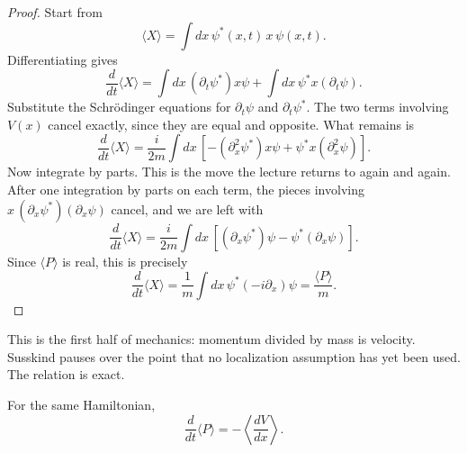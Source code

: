 \begin{proof}
Start from
\begin{equation}
\langle X\rangle=\int dx\,\psi^*(x,t)\,x\,\psi(x,t).
\end{equation}
Differentiating gives
\begin{equation}
\frac{d}{dt}\langle X\rangle
=
\int dx\,(\partial_t\psi^*)x\psi
+
\int dx\,\psi^*x(\partial_t\psi).
\end{equation}
Substitute the Schr\"odinger equations for \(\partial_t\psi\) and \(\partial_t\psi^*\). The two terms involving \(V(x)\) cancel exactly, since they are equal and opposite. What remains is
\begin{equation}
\frac{d}{dt}\langle X\rangle
=
\frac{i}{2m}\int dx\,
\left[
-(\partial_x^2\psi^*)x\psi+\psi^*x(\partial_x^2\psi)
\right].
\end{equation}
Now integrate by parts. This is the move the lecture returns to again and again. After one integration by parts on each term, the pieces involving \(x\,(\partial_x\psi^*)(\partial_x\psi)\) cancel, and we are left with
\begin{equation}
\frac{d}{dt}\langle X\rangle
=
\frac{i}{2m}\int dx\,
\left[
(\partial_x\psi^*)\psi-\psi^*(\partial_x\psi)
\right].
\end{equation}
Since \(\langle P\rangle\) is real, this is precisely
\begin{equation}
\frac{d}{dt}\langle X\rangle
=
\frac{1}{m}\int dx\,\psi^*(-i\partial_x)\psi
=
\frac{\langle P\rangle}{m}.
\end{equation}
\end{proof}

This is the first half of mechanics: momentum divided by mass is velocity. Susskind pauses over the point that no localization assumption has yet been used. The relation is exact.

\begin{proposition}
For the same Hamiltonian,
\begin{equation}
\frac{d}{dt}\langle P\rangle=-\left\langle \frac{dV}{dx}\right\rangle.
\end{equation}
\end{proposition}

